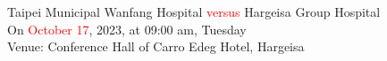 \documentclass[25pt,a1paper]{tikzposter}
\begin{document}
\fontsize{220}{300} \sc
Taipei Municipal Wanfang Hospital \textcolor{red}{versus} Hargeisa Group Hospital\\
On \textcolor{red}{October 17}, 2023, at 09:00 am, Tuesday \\
Venue: Conference Hall of Carro Edeg Hotel, Hargeisa

\vspace{7cm}




\end{document}
